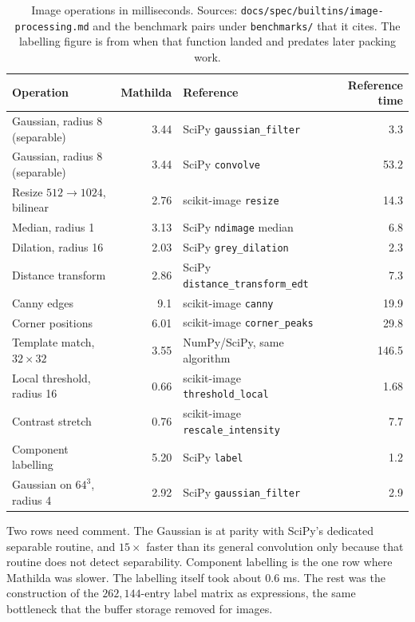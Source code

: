 \begin{table}[ht]
\centering
\small
\begin{tabular}{@{}lrlr@{}}
\toprule
Operation & Mathilda & Reference & Reference time \\
\midrule
Gaussian, radius 8 (separable) & 3.44 & SciPy \texttt{gaussian\_filter} & 3.3 \\
Gaussian, radius 8 (separable) & 3.44 & SciPy \texttt{convolve} & 53.2 \\
Resize \(512\to1024\), bilinear & 2.76 & scikit-image \texttt{resize} & 14.3 \\
Median, radius 1 & 3.13 & SciPy \texttt{ndimage} median & 6.8 \\
Dilation, radius 16 & 2.03 & SciPy \texttt{grey\_dilation} & 2.3 \\
Distance transform & 2.86 & SciPy \texttt{distance\_transform\_edt} & 7.3 \\
Canny edges & 9.1 & scikit-image \texttt{canny} & 19.9 \\
Corner positions & 6.01 & scikit-image \texttt{corner\_peaks} & 29.8 \\
Template match, \(32\times32\) & 3.55 & NumPy/SciPy, same algorithm & 146.5 \\
Local threshold, radius 16 & 0.66 & scikit-image \texttt{threshold\_local} & 1.68 \\
Contrast stretch & 0.76 & scikit-image \texttt{rescale\_intensity} & 7.7 \\
Component labelling & 5.20 & SciPy \texttt{label} & 1.2 \\
Gaussian on \(64^3\), radius 4 & 2.92 & SciPy \texttt{gaussian\_filter} & 2.9 \\
\bottomrule
\end{tabular}
\caption{Image operations in milliseconds. Sources:
\texttt{docs/spec/builtins/image-processing.md} and the benchmark pairs under
\texttt{benchmarks/} that it cites. The labelling figure is from when that function
landed and predates later packing work.}
\label{tab:img-bench}
\end{table}

Two rows need comment. The Gaussian is at parity with SciPy's dedicated separable
routine, and \(15\times\) faster than its general convolution only because that
routine does not detect separability. Component labelling is the one row where
Mathilda was slower. The labelling itself took about \(0.6\) ms. The rest was the
construction of the \(262{,}144\)-entry label matrix as expressions, the same
bottleneck that the buffer storage removed for images.

